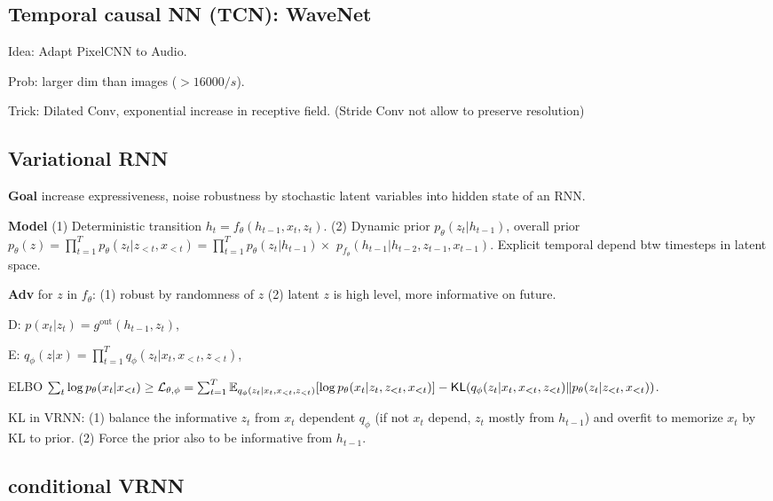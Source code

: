 \subsection*{Temporal causal NN (TCN): WaveNet}

Idea: Adapt PixelCNN to Audio.

Prob: larger dim than images (\(>16000/{s}\)).

Trick: Dilated Conv, exponential increase in receptive field. (Stride Conv not allow to preserve resolution)

\subsection*{Variational RNN}

\textbf{Goal} increase expressiveness, noise robustness by stochastic latent variables into hidden state of an RNN.

\textbf{Model}
(1) Deterministic transition \(h_{t}=f_{\theta}(h_{t-1}, x_{t}, z_{t})\).
(2) Dynamic prior \(p_{\theta}(z_{t} | h_{t-1})\), overall prior \(p_{\theta}(z)=\prod_{t=1}^{T} p_{\theta}(z_{t}|z_{<t}, x_{<t}) = \prod_{t=1}^{T} p_{\theta}(z_{t} | h_{t-1})\times\) \( p_{f_\theta}(h_{t-1} | h_{t-2}, z_{t-1}, x_{t-1})\). Explicit temporal depend btw timesteps in latent space.

\textbf{Adv} for \(z\) in \(f_{\theta}\): (1) robust by randomness of \(z\) (2) latent \(z\) is high level, more informative on future.

\textsf{{D}}: \(p(x_{t} | z_{t})=g^{\text{out}}(h_{t-1}, z_{t})\),

\textsf{{E}}: \(q_{\phi}(z | x)=\prod_{t=1}^{T} q_{\phi}(z_{t} | x_{t}, x_{<t}, z_{<t})\),

\textsf{{ELBO}} \(\sum_t \log p_{\theta}(x_{t}|x_{< t}) \geq \mathcal{L}_{\theta, \phi}=\sum_{t=1}^{T} \mathbb{E}_{q_{\phi}(z_{t} | x_{t}, x_{<t}, z_{<t})}[\log p_{\theta}(x_{t} | z_{t}, z_{<t}, x_{<t})]-\operatorname{\mathsf{KL}}(q_{\phi}(z_{t} | x_{t}, x_{<t}, z_{<t}) \| p_{\theta}(z_{t} | z_{<t}, x_{<t}))\).

KL in VRNN: (1) balance the informative \(z_t\) from \(x_t\) dependent \(q_\phi\) (if not \(x_t\) depend, \(z_t\) mostly from \(h_{t-1}\)) and overfit to memorize \(x_t\) by KL to prior. (2) Force the prior also to be informative from \(h_{t-1}\).


\subsection*{conditional VRNN }

